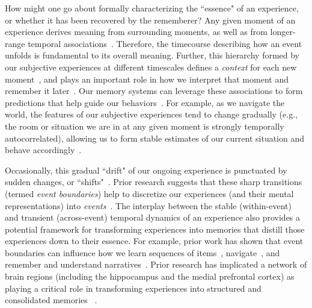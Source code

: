 \documentclass{article}
\begin{document}
How might one go about formally characterizing the ``essence" of an experience, or whether it has been recovered by the rememberer?  Any given moment of an experience derives meaning from surrounding moments, as well as from longer-range temporal associations~\citep{LernEtal11, Mann19}.  Therefore, the timecourse describing how an event unfolds is fundamental to its overall meaning.  Further, this hierarchy formed by our subjective experiences at different timescales defines a \textit{context} for each new moment~\citep[e.g., ][]{HowaKaha02a, HowaEtal14}, and plays an important role in how we interpret that moment and remember it later~\citep[for review see][]{MannEtal15}.  Our memory systems can leverage these associations to form predictions that help guide our behaviors~\citep{RangRitc12}.  For example, as we navigate the world, the features of our subjective experiences tend to change gradually (e.g., the room or situation we are in at any given moment is strongly temporally autocorrelated), allowing us to form stable estimates of our current situation and behave accordingly~\citep{ZackEtal07, ZwaaRadv98}.

Occasionally, this gradual ``drift" of our ongoing experience is punctuated by sudden changes, or ``shifts"~\citep[e.g., when we walk through a doorway; ][]{RadvZack17}.  Prior research suggests that these sharp transitions (termed \textit{event boundaries}) help to discretize our experiences (and their mental representations) into \textit{events}~\citep{RadvZack17, BrunEtal18, HeusEtal18b, ClewDava17, EzzyDava11, DuBrDava13}.  The interplay between the stable (within-event) and transient (across-event) temporal dynamics of an experience also provides a potential framework for transforming experiences into memories that distill those experiences down to their essence.  For example, prior work has shown that event boundaries can influence how we learn sequences of items~\citep{HeusEtal18b, DuBrDava13}, navigate~\citep{BrunEtal18}, and remember and understand narratives~\citep{ZwaaRadv98, EzzyDava11}. Prior research has implicated a network of brain regions (including the hippocampus and the medial prefrontal cortex) as playing a critical role in transforming experiences into structured and consolidated memories ~\citep{TompDava17}.
\end{document}

